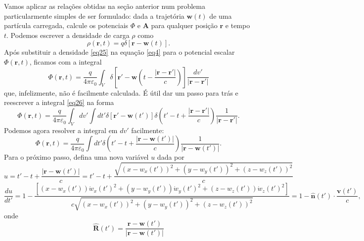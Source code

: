 \documentclass{article}
\begin{document}
Vamos aplicar as relações obtidas na seção anterior num problema particularmente simples de ser formulado: dada a trajetória $\mathbf{w}(t)$ de uma partícula carregada, calcule os potenciais $\Phi$ e $\mathbf{A}$ para qualquer posição $\mathbf{r}$ e tempo $t$. Podemos escrever a densidade de carga $\rho$ como
\begin{equation}
    \rho(\mathbf{r},t) = q\delta[\mathbf{r}-\mathbf{w}(t)].
    \label{eq25}
\end{equation}
Após substituir a densidade \eqref{eq25} na equação \eqref{eq4} para o potencial escalar $\Phi(\mathbf{r},t)$, ficamos com a integral
\begin{equation}
    \Phi(\mathbf{r},t) = \frac{q}{4\pi\varepsilon_0}\int_{V} \delta\left[ \mathbf{r}' - \mathbf{w}\left(t-\frac{|\mathbf{r} - \mathbf{r}'|}{c}\right) \right] \frac{dv'}{|\mathbf{r} - \mathbf{r}'|}
    \label{eq26}
\end{equation}
que, infelizmente, não é facilmente calculada. É útil dar um passo para trás e reescrever a integral \eqref{eq26} na forma
\begin{equation}
    \Phi(\mathbf{r},t) = \frac{q}{4\pi\varepsilon_0}\int_{V}dv'\int dt' \delta\left[ \mathbf{r}' - \mathbf{w}\left(t'\right) \right]\delta\left( t'- t + \frac{|\mathbf{r}-\mathbf{r}'|}{c} \right) \frac{1}{|\mathbf{r} - \mathbf{r}'|}.   
\end{equation}
Podemos agora resolver a integral em $dv'$ facilmente:
\begin{equation}
    \Phi(\mathbf{r},t) = \frac{q}{4\pi\varepsilon_0}\int dt' \delta\left( t'- t + \frac{|\mathbf{r}-\mathbf{w}(t')|}{c} \right) \frac{1}{|\mathbf{r} - \mathbf{w}(t')|}.   
\end{equation}
Para o próximo passo, defina uma nova variável $u$ dada por
\begin{equation}
    u = t'- t + \frac{|\mathbf{r}-\mathbf{w}(t')|}{c} = t' - t + \frac{\sqrt{(x-w_x (t'))^2 + (y-w_y (t'))^2 + (z-w_z (t'))^2}}{c}
\end{equation}
\begin{equation}
    \frac{du}{dt'} = 1 - \frac{[(x-w_x(t'))\dot{w}_x(t')^2 + (y-w_y(t'))\dot{w}_y(t')^2 + (z-w_z(t'))\dot{w}_z(t')^2 ]}{c\sqrt{(x-w_x (t'))^2 + (y-w_y (t'))^2 + (z-w_z (t'))^2}} = 1 - \hat{\mathbf{n}}(t')\cdot\frac{\mathbf{v}(t')}{c},
\end{equation}
onde
\begin{equation}
    \hat{\mathbf{R}}(t') = \frac{\mathbf{r} - \mathbf{w}(t')}{|\mathbf{r} - \mathbf{w}(t')|}
\end{equation}
\end{document}
